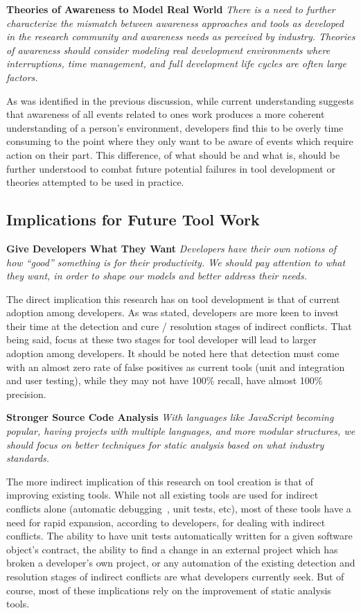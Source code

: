 \documentclass[conference]{IEEEtran}
\begin{document}
\textbf{Theories of Awareness to Model Real World} \textit{There is a need to further characterize the
mismatch between awareness approaches and tools as developed in the research community and awareness needs as perceived
by industry. Theories of awareness should consider modeling real development
environments where interruptions, time management, and full development life cycles are often large factors.}

As was identified in the previous discussion, while current understanding suggests that awareness of all events related to ones work
produces a more coherent understanding of a person's environment, developers find this to be overly time consuming
to the point where they only want to be aware of events which require action on their part. This difference, of what
should be and what is, should be further understood to combat future potential failures in
tool development or theories attempted to be used in practice.

\subsection{Implications for Future Tool Work}
\label{sec:implt}

\textbf{Give Developers What They Want} \textit{Developers have their own notions of how ``good''
something is for their productivity. We should pay attention to what they want, in order to shape our
models and better address their needs.}

The direct implication this research has on tool development is that of current adoption among developers. As was stated,
developers are more keen to invest their time at the detection and cure / resolution stages of indirect conflicts. That being
said, focus at these two stages for tool developer will lead to larger adoption among developers.
It should be noted here that detection must come with an almost zero rate of false positives as
current tools (unit and integration and user testing), while they may not have 100\% recall, have almost 100\% precision.

\textbf{Stronger Source Code Analysis} \textit{With languages like JavaScript becoming popular, having projects with
multiple languages, and more modular structures, we should focus on better techniques for static analysis based
on what industry standards.}

The more indirect implication of this research on tool creation is that of improving existing tools. While not all existing
tools are used for indirect conflicts alone (automatic debugging~\cite{Zeller:2005:WPF}, unit tests, etc), most of these tools
have a need for rapid expansion, according to developers, for dealing with indirect conflicts. The ability to have unit tests
automatically written for a given software object's contract, the ability to find a change  in an external project
which has broken a developer's own project, or any automation of the existing detection and resolution stages of indirect
conflicts are what developers currently seek. But of course, most of these implications rely on the improvement of
static analysis tools.
\end{document}

